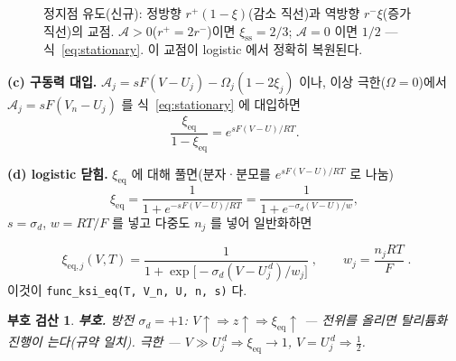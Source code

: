 \documentclass[11pt,a4paper]{article}
\newtheorem*{signbox}{부호 검산}
\newcommand{\eq}{\mathrm{eq}}
\newcommand{\sstat}{\mathrm{ss}}
\newcommand{\code}[1]{\texttt{#1}}
\begin{document}
\begin{figure}[t]
\centering
{}
\caption{정지점 유도(신규): 정방향 $r^+(1-\xi)$(감소 직선)과 역방향 $r^-\xi$(증가 직선)의 교점.
$\mathcal A>0$($r^+=2r^-$)이면 $\xi_{\sstat}=2/3$; $\mathcal A=0$ 이면 $1/2$ — 식~\eqref{eq:stationary}.
이 교점이 logistic 에서 정확히 복원된다.}
\label{fig:fluxcross}
\end{figure}

\textbf{(c) 구동력 대입.} $\mathcal A_j = sF(V-U_j) - \Omega_j(1-2\xi_j)$ 이나, 이상 극한($\Omega=0$)에서
$\mathcal A_j = sF(V_n-U_j)$ 를 식~\eqref{eq:stationary} 에 대입하면
\begin{equation}
\frac{\xi_\eq}{1-\xi_\eq} = e^{sF(V-U)/RT}.
\label{eq:logitsolve}
\end{equation}

\textbf{(d) logistic 닫힘.} $\xi_\eq$ 에 대해 풀면(분자·분모를 $e^{sF(V-U)/RT}$ 로 나눔)
\begin{equation}
\xi_\eq = \frac{1}{1+e^{-sF(V-U)/RT}} = \frac{1}{1+e^{-\sigma_d(V-U)/w}},
\end{equation}
$s=\sigma_d$, $w=RT/F$ 를 넣고 다중도 $n_j$ 를 넣어 일반화하면

\begin{equation}
\boxed{\;\xi_{\eq,j}(V,T)=\frac{1}{1+\exp\!\big[-\sigma_d(V-U_j^{\,d})/w_j\big]}\;,\qquad
w_j=\frac{n_jRT}{F}\;.}
\label{eq:xieq}
\end{equation}
이것이 \code{func\_ksi\_eq(T, V\_n, U, n, s)} 다.

\begin{signbox}
\textbf{부호.} 방전 $\sigma_d=+1$: $V\!\uparrow\Rightarrow z\!\uparrow\Rightarrow\xi_\eq\!\uparrow$ —
전위를 올리면 탈리튬화 진행이 는다(규약 일치). 극한 — $V\gg U_j^{\,d}\Rightarrow\xi_\eq\to1$,
$V=U_j^{\,d}\Rightarrow\tfrac12$.
\end{signbox}
\end{document}
